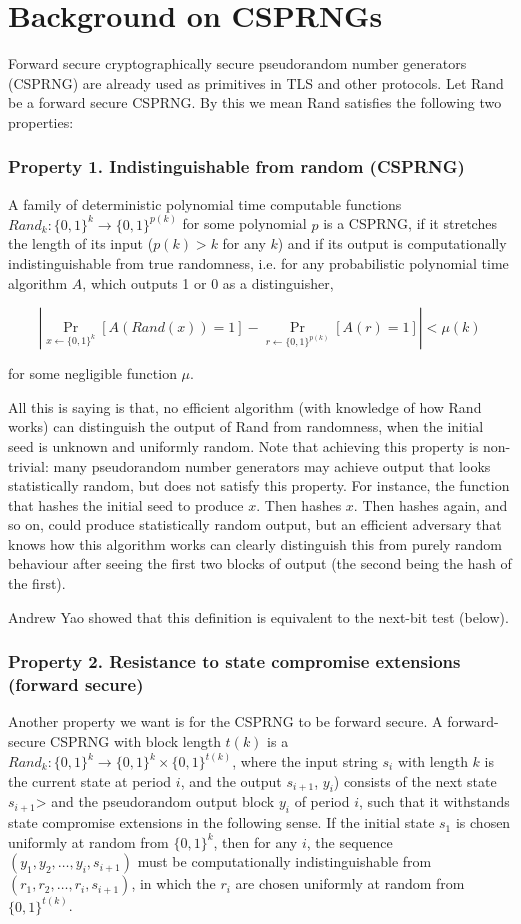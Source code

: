 \documentclass{article}
\begin{document}
\section{Background on CSPRNGs} \label{CSPRNG}
Forward secure cryptographically secure pseudorandom number generators (CSPRNG) are already used as primitives in TLS and other protocols. Let Rand be a forward secure CSPRNG. By this we mean Rand satisfies the following two properties:

\subsubsection*{Property 1. Indistinguishable from random (CSPRNG)}

A family of deterministic polynomial time computable functions $Rand_{k}
\colon \{0, 1\}^{k} \rightarrow \{0, 1 \}^{p(k)}$ for some polynomial
$p$ is a  CSPRNG, if it stretches the length of its input ($p(k) > k$ for any $k$) and if its output is computationally indistinguishable from true randomness, i.e. for any probabilistic polynomial time algorithm $A$, which outputs 1 or 0 as a distinguisher,

$$ |\Pr_{x\gets\{0,1\}^k}[A(Rand(x))=1] - \Pr_{r\gets\{0,1\}^{p(k)}}[A(r)=1]| < \mu(k) $$

\noindent for some negligible function $\mu$.

All this is saying is that, no efficient algorithm (with knowledge of how Rand works) can distinguish the output of Rand from randomness, when the initial seed is unknown and uniformly random. Note that achieving this property is non-trivial: many pseudorandom number generators may achieve output that looks statistically random, but does not satisfy this property. For instance, the function that hashes the initial seed to produce $x$. Then hashes $x$. Then hashes again, and so on, could produce statistically random output, but an efficient adversary that knows how this algorithm works can clearly distinguish this from purely random behaviour after seeing the first two blocks of output (the second being the hash of the first).

Andrew Yao showed that this definition is equivalent to the next-bit test (below).

\subsubsection*{Property 2. Resistance to state compromise extensions (forward secure)}
Another property we want is for the CSPRNG to be forward secure. A forward-secure CSPRNG with block length $t(k)$ is a $Rand_{k} \colon \{0,1\}^k \to \{0,1\}^k \times \{0,1\}^{t(k)}$, where the input string $s_i$ with length $k$ is the current state at period $i$, and the output $s_{i+1}$, $y_i$) consists of the next state $s_{i+1}$> and the pseudorandom output block $y_i$ of period $i$, such that it withstands state compromise extensions in the following sense. If the initial state $s_1$ is chosen uniformly at random from $\{0,1\}^k$, then for any $i$, the sequence $(y_1, y_2,\dots, y_i,s_{i+1})$ must be computationally indistinguishable from $(r_1,r_2,\dots,r_i,s_{i+1})$, in which the $r_i$ are chosen uniformly at random from $\{0,1\}^{t(k)}$.
\end{document}
